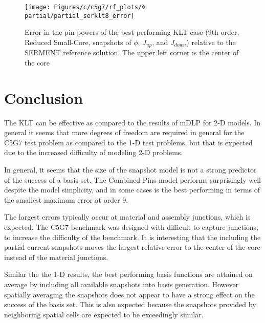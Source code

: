 \begin{figure*}[tb]
    \centering
    \texttt{[image: Figures/c/c5g7/rf\_plots/\%
                          partial/partial\_serklt8\_error]}
    \caption{Error in the pin powers of the best performing KLT case (9th 
order, Reduced Small-Core, snapshots of $\phi$, $J_{up}$, and $J_{down}$) relative to the 
SERMENT reference solution.  The upper left corner is the center of the 
core}
    \label{fig:serkltpartial}
\end{figure*}

\section{Conclusion}

The KLT can be effective as compared to the results of mDLP for 2-D models.  In 
general it seems that more degrees of freedom are required in general for the 
C5G7 test problem as compared to the 1-D test problems, but that is expected 
due to the increased difficulty of modeling 2-D problems.  

In general, it seems that the size of the snapshot model is not a strong 
predictor of the success of a basis set.  The Combined-Pins model performs 
surprisingly well despite the model simplicity, and in some cases is the best 
performing in terms of the smallest maximum error at order 9.

The largest errors typically occur at material and assembly junctions, which is 
expected.  The C5G7 benchmark was designed with difficult to capture junctions, 
to increase the difficulty of the benchmark.  It is interesting that the 
including the partial current snapshots moves the largest relative error to the 
center of the core instead of the material junctions.  

Similar the the 1-D results, the best performing basis functions are attained 
on average by including all available snapshots into basis generation.  However 
spatially averaging the snapshots does not appear to have a strong effect on 
the success of the basis set.  This is also expected because the snapshots 
provided by neighboring spatial cells are expected to be exceedingly similar.